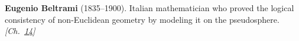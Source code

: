 \textbf{Eugenio Beltrami} (1835–1900). Italian mathematician who proved the logical consistency of non-Euclidean geometry by modeling it on the pseudosphere. \emph{[Ch.~\hyperref[ch:compacttwinparadox]{14}]}

